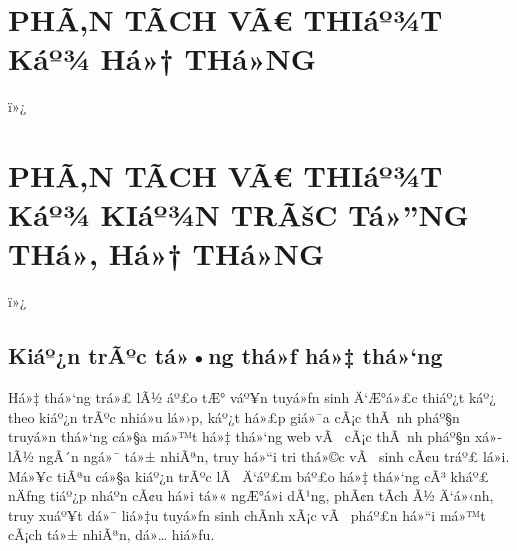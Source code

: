 ﻿\documentclass[12pt,a4paper]{report}
\begin{document}
\chapter{PHÃ‚N TÃCH VÃ€ THIáº¾T Káº¾ Há»† THá»NG}
\begingroup
\let\originalchapter\chapter
\let\originalsection\section
\let\originalsubsection\subsection
\let\originalsubsubsection\subsubsection
\RenewDocumentCommand{\chapter}{s m}{\originalsection{#2}}
\RenewDocumentCommand{\section}{s m}{%
    \IfBooleanTF{#1}{\originalsubsection*{#2}}{\originalsubsection{#2}}%
}
\RenewDocumentCommand{\subsection}{s m}{%
    \IfBooleanTF{#1}{\originalsubsubsection*{#2}}{\originalsubsubsection{#2}}%
}

ï»¿\chapter{PHÃ‚N TÃCH VÃ€ THIáº¾T Káº¾ KIáº¾N TRÃšC Tá»”NG THá»‚ Há»† THá»NG}


ï»¿\section{Kiáº¿n trÃºc tá»•ng thá»ƒ há»‡ thá»‘ng}

Há»‡ thá»‘ng trá»£ lÃ½ áº£o tÆ° váº¥n tuyá»ƒn sinh Ä‘Æ°á»£c thiáº¿t káº¿ theo kiáº¿n trÃºc nhiá»u lá»›p, káº¿t há»£p giá»¯a cÃ¡c thÃ nh pháº§n truyá»n thá»‘ng cá»§a má»™t há»‡ thá»‘ng web vÃ  cÃ¡c thÃ nh pháº§n xá»­ lÃ½ ngÃ´n ngá»¯ tá»± nhiÃªn, truy há»“i tri thá»©c vÃ  sinh cÃ¢u tráº£ lá»i. Má»¥c tiÃªu cá»§a kiáº¿n trÃºc lÃ  Ä‘áº£m báº£o há»‡ thá»‘ng cÃ³ kháº£ nÄƒng tiáº¿p nháº­n cÃ¢u há»i tá»« ngÆ°á»i dÃ¹ng, phÃ¢n tÃ­ch Ã½ Ä‘á»‹nh, truy xuáº¥t dá»¯ liá»‡u tuyá»ƒn sinh chÃ­nh xÃ¡c vÃ  pháº£n há»“i má»™t cÃ¡ch tá»± nhiÃªn, dá»… hiá»ƒu.
\end{document}
